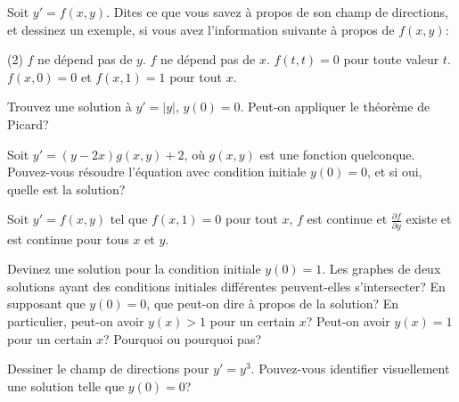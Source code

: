 \begin{exercise}
	Soit $y' = f(x,y)$.  Dites ce que vous savez à propos de son champ de directions,
	et dessinez un exemple, si vous avez l'information suivante à propos de  $f(x,y)$:
	\begin{tasks}(2)
		\task $f$ ne dépend pas de $y$.
		\task $f$ ne dépend pas de $x$.
		\task $f(t,t) = 0$ pour toute valeur $t$.
		\task $f(x,0) = 0$ et $f(x,1) = 1$ pour tout $x$.
	\end{tasks}
\end{exercise}

\begin{exercise}
	Trouvez une solution à $y' = \lvert y \rvert$, $y(0) = 0$.  Peut-on appliquer le théorème de Picard?
\end{exercise}

\begin{exercise}
	Soit $y' = (y-2x) g(x,y) + 2$, où $g(x,y)$ est une fonction quelconque.
	Pouvez-vous résoudre l'équation avec condition initiale $y(0) = 0$, et si oui, quelle est la solution?
\end{exercise}

\begin{exercise}[défi]
	\pagebreak[2]
	Soit $y' = f(x,y)$ tel que $f(x,1) = 0$ pour tout $x$,
	$f$ est continue et $\frac{\partial f}{\partial y}$ existe et est continue pour tous $x$ et $y$.
	\begin{tasks}
		\task Devinez une solution pour la condition initiale $y(0) = 1$.
		\task Les graphes de deux solutions ayant des conditions initiales différentes peuvent-elles s'intersecter?
		\task En supposant que $y(0) = 0$, que peut-on dire à propos de la solution?
				En particulier, peut-on avoir $y(x) > 1$ pour un certain $x$?
				Peut-on avoir $y(x) = 1$ pour un certain  $x$?  Pourquoi ou pourquoi pas?
	\end{tasks}
\end{exercise}

\setcounter{exercise}{100}

\begin{exercise}
	Dessiner le champ de directions pour $y'=y^3$.  Pouvez-vous identifier visuellement une solution telle que $y(0)=0$?
\end{exercise}

